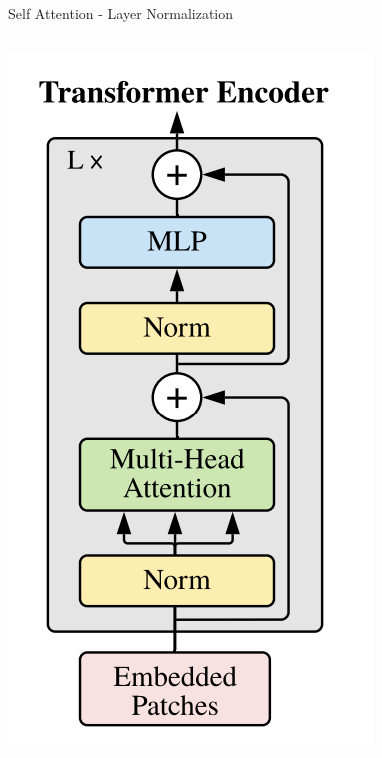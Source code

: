 \documentclass[aspectratio=169,xcolor=dvipsnames]{beamer}
\begin{document}
\begin{frame}{Self Attention - Layer Normalization}
    \begin{columns}
        \begin{column}{0.25\textwidth}
        \includegraphics[width=\textwidth]{figures/transformer_encoder.png}
        \end{column}

\end{columns}
\end{frame}
\end{document}
